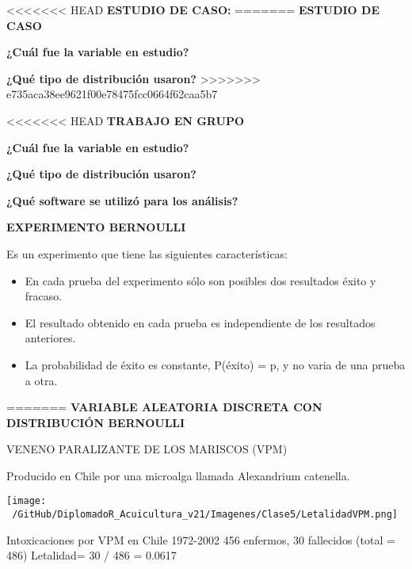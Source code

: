 \documentclass[ignorenonframetext,]{beamer}
\begin{document}
\begin{frame}{}
\protect\hypertarget{section-3}{}

<<<<<<< HEAD
\textbf{ESTUDIO DE CASO:}
=======
\textbf{ESTUDIO DE CASO}

\textbf{¿Cuál fue la variable en estudio?}

\textbf{¿Qué tipo de distribución usaron?}
>>>>>>> e735aca38ee9621f00e78475fcc0664f62caa5b7

\end{frame}

\begin{frame}{}
\protect\hypertarget{section-4}{}

<<<<<<< HEAD
\textbf{TRABAJO EN GRUPO}

\textbf{¿Cuál fue la variable en estudio?}

\textbf{¿Qué tipo de distribución usaron?}

\textbf{¿Qué software se utilizó para los análisis?}

\begin{block}{}

\textbf{EXPERIMENTO BERNOULLI}

Es un experimento que tiene las siguientes características:

\begin{itemize}
\item
  En cada prueba del experimento sólo son posibles dos resultados éxito
  y fracaso.
\item
  El resultado obtenido en cada prueba es independiente de los
  resultados anteriores.
\item
  La probabilidad de éxito es constante, P(éxito) = p, y no varia de una
  prueba a otra.
\end{itemize}

\begin{block}{}

=======
\textbf{VARIABLE ALEATORIA DISCRETA CON DISTRIBUCIÓN BERNOULLI}

VENENO PARALIZANTE DE LOS MARISCOS (VPM)

Producido en Chile por una microalga llamada Alexandrium catenella.

\texttt{[image: ~/GitHub/DiplomadoR\_Acuicultura\_v21/Imagenes/Clase5/LetalidadVPM.png]}

Intoxicaciones por VPM en Chile 1972-2002 456 enfermos, 30 fallecidos
(total = 486) Letalidad= 30 / 486 = 0.0617

\begin{block}{}


\end{block}
\end{block}
\end{block}
\end{frame}
\end{document}

